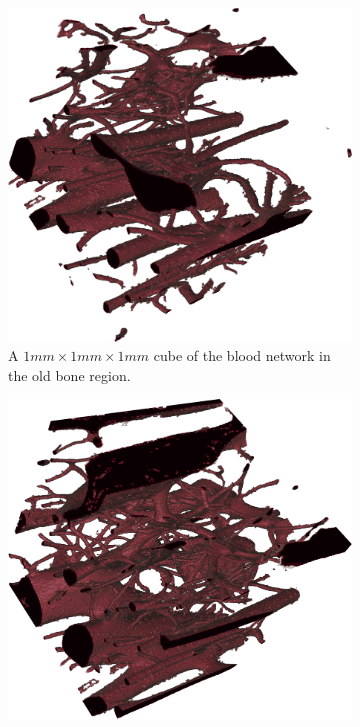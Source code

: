 \begin{figure}
\begin{subfigure}[b]{.48\linewidth}
        \includegraphics[width=.9\linewidth,height=\linewidth]{generated/figure10_old_cube.png}
        \caption{A $1mm \times 1 mm \times 1 mm$ cube of the blood network in the old bone region.}
        \label{fig:blood-old-cube}
    \end{subfigure}
    \hfill
    \begin{subfigure}[b]{.48\linewidth}
    \centering
        \includegraphics[width=.9\linewidth,height=\linewidth]{generated/figure10_new_cube.png}

\end{subfigure}
\end{figure}
